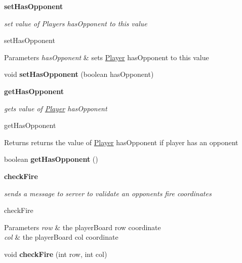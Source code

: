 \begin{Indent}{\bf set\+Has\+Opponent}\par
{\em set value of Players has\+Opponent to this value

set\+Has\+Opponent


\begin{DoxyParams}{Parameters}
{\em has\+Opponent} & sets \hyperlink{classbattleship_1_1game_1_1Player}{Player} has\+Opponent to this value \\
\hline
\end{DoxyParams}
}\begin{DoxyCompactItemize}
\item 
\hypertarget{classbattleship_1_1game_1_1Player_a585fc5f47cdfcb0dd4cff902d9103c9c}{}void {\bfseries set\+Has\+Opponent} (boolean has\+Opponent)\label{classbattleship_1_1game_1_1Player_a585fc5f47cdfcb0dd4cff902d9103c9c}

\end{DoxyCompactItemize}
\end{Indent}
\begin{Indent}{\bf get\+Has\+Opponent}\par
{\em gets value of \hyperlink{classbattleship_1_1game_1_1Player}{Player} has\+Opponent

get\+Has\+Opponent

\begin{DoxyReturn}{Returns}
returns the value of \hyperlink{classbattleship_1_1game_1_1Player}{Player} has\+Opponent  if player has an opponent 
\end{DoxyReturn}
}\begin{DoxyCompactItemize}
\item 
\hypertarget{classbattleship_1_1game_1_1Player_a7978d165f7134f08604c54b0a7fda8c7}{}boolean {\bfseries get\+Has\+Opponent} ()\label{classbattleship_1_1game_1_1Player_a7978d165f7134f08604c54b0a7fda8c7}

\end{DoxyCompactItemize}
\end{Indent}
\begin{Indent}{\bf check\+Fire}\par
{\em sends a message to server to validate an opponents fire coordinates

check\+Fire


\begin{DoxyParams}{Parameters}
{\em row} & the player\+Board row coordinate \\
\hline
{\em col} & the player\+Board col coordinate \\
\hline
\end{DoxyParams}
}\begin{DoxyCompactItemize}
\item 
\hypertarget{classbattleship_1_1game_1_1Player_a0841195e67fb60d3d94ada31f968016a}{}void {\bfseries check\+Fire} (int row, int col)\label{classbattleship_1_1game_1_1Player_a0841195e67fb60d3d94ada31f968016a}

\end{DoxyCompactItemize}
\end{Indent}
